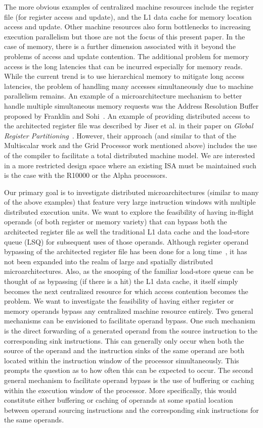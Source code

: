 \documentclass[10pt,dvips]{article}
\begin{document}
The more obvious examples of centralized machine resources include
the register file (for register access and update),
and the L1 data cache for memory location access and update.
Other machine resources also form bottlenecks to increasing
execution parallelism but those are not the focus of this present
paper.
In the case of memory, there is a further dimension associated
with it beyond the problems of access and update contention.
The additional problem for memory access is the long latencies
that can be incurred especially for memory reads.
While the current trend is to use hierarchical memory to mitigate
long access latencies, the problem of
handling many accesses simultaneously due to machine parallelism remains.
An example of a microarchitecture mechanism to better handle
multiple simultaneous memory requests was the Address Resolution
Buffer proposed by Franklin and Sohi~\cite{franklin96arb}.
An example of providing distributed access to the architected
register file was described by Jiser et al. in their paper on
\textit{Global Register Partitioning}~\cite{Jiser00}.
However, their approach (and similar to that of the Multiscalar
work and the Grid Processor work mentioned above) includes
the use of the compiler to facilitate a total distributed 
machine model.
We are interested in a more restricted design space where an existing
ISA must be maintained such is the case with the R10000 or the Alpha
processors.

Our primary goal is to investigate distributed microarchitectures
(similar to many of the above examples) that feature very large
instruction windows with multiple distributed execution units.
We want to explore the feasibility of having in-flight operands
(of both register or memory variety) that can bypass both the
architected register file as well the traditional L1
data cache and the load-store queue (LSQ) for subsequent uses of
those operands.
Although register operand bypassing of the architected register 
file has been done for a long time~\cite{Tom67},
it has not been expanded into the realm of large and spatially distributed
microarchitectures.
Also, as the snooping of the familiar load-store queue can be
thought of as bypassing (if there is a hit) the L1 data cache, it
itself simply becomes the next centralized resource for which
access contention becomes the problem.
We want to investigate the feasibility of having 
either register or memory operands bypass any centralized
machine resource entirely.  
Two general mechanisms can be envisioned to facilitate
operand bypass.  
One such mechanism is the direct forwarding of a generated
operand from the source instruction to the corresponding sink
instructions.
This can generally only occur when
both the source of the operand and the instruction sinks of the same
operand are both located within the instruction window of the
processor simultaneously.  
This prompts the question as to how
often this can be expected to occur.
The second general mechanism to facilitate operand
bypass is the use of buffering or caching within the execution
window of the processor.
More specifically, this would constitute either buffering or caching of
operands at some spatial location between operand sourcing instructions
and the corresponding sink instructions for the same operands.
\end{document}
